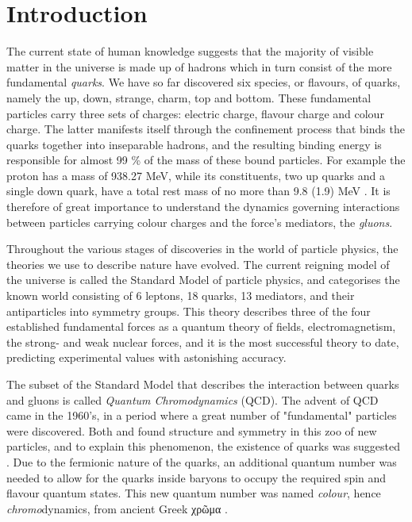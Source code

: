 \chapter{Introduction}

The current state of human knowledge suggests that the majority of visible
matter in the universe is made up of hadrons which in turn consist of
the more fundamental \emph{quarks}. We have so far discovered six species, or
flavours, of quarks, namely the up, down, strange, charm, top and bottom. These
fundamental particles carry three sets of charges: electric charge, flavour
charge and colour charge. The latter manifests itself
through the confinement process that binds the quarks together into inseparable
hadrons, and the resulting binding energy is responsible for almost 99 \% of the
mass of these bound particles. For example the proton has a mass of 938.27 MeV,
while its constituents, two up quarks and a single down quark, have a total rest
mass of no more than 9.8 (1.9) MeV \citep{Agashe:2014kda}. It is therefore of
great importance to understand the dynamics governing interactions between
particles carrying colour charges and the force's mediators, the \emph{gluons}. 

Throughout the various stages of discoveries in the world of particle physics,
the theories we use to describe nature have evolved. The current reigning model
of the universe is called the Standard Model of particle physics, and
categorises the known world consisting of 6 leptons, 18 quarks, 13 mediators,
and their antiparticles into symmetry groups. This theory describes three of
the four established fundamental forces as a quantum theory of fields,
electromagnetism, the strong- and weak nuclear forces, and it is
the most successful theory to date, predicting experimental values with
astonishing accuracy.

The subset of the Standard Model that describes the interaction between quarks
and gluons is called \emph{Quantum Chromodynamics} (QCD). The advent of QCD came
in the 1960's, in a period where a great number of "fundamental" particles were 
discovered. Both \cite{GellMann:1962xb} and \cite{Ne'eman:1961cd} found
structure and symmetry in this zoo of new particles, and to explain this
phenomenon, the existence of quarks was suggested \citep{GellMann:1964nj}.
Due to the fermionic nature of the quarks, an additional quantum number was
needed to allow for the quarks inside baryons to occupy the required spin
and flavour quantum states. This new quantum number was named \emph{colour},
hence \emph{chromo}dynamics, from ancient Greek χρῶμα \citep{Greenberg:1964pe}.


